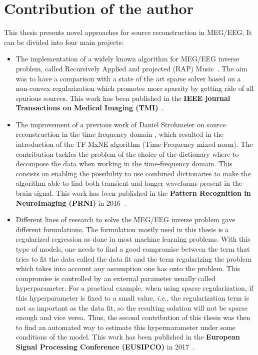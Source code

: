 \section*{Contribution of the author}
This thesis presents novel approaches for source reconstruction in MEG/EEG. It can be divided into four main projects:
\begin{itemize}
\item The implementation of a widely known algorithm for MEG/EEG inverse problem, called Recursively Applied and projected (RAP) Music~\cite{mosher-leahy:1999}. The aim was to have a comparison with a state of the art sparse solver based on a non-convex regularization which promotes more sparsity by getting ride of all spurious sources. This work has been published in the \textbf{IEEE journal Transactions on Medical Imaging (TMI)}~\cite{strohmeier-etal:16}.

\item The improvement of a previous work of Daniel Strohmeier on source reconstruction in the time frequency domain , which resulted in the introduction of the TF-MxNE algorithm (Time-Frequency mixed-norm). The contribution tackles the problem of the choice of the dictionary where to decompose the data when working in the time-frequency domain. This consists on enabling the possibility to use combined dictionaries to make the algorithm able to find both transient and longer waveforms present in the brain signal. This work has been published in the \textbf{Pattern Recognition in NeuroImaging (PRNI)} in 2016~\cite{bekhti2016m}.

\item Different lines of research to solve the MEG/EEG inverse problem gave different formulations. The formulation mostly used in this thesis is a regularized regression as done in most machine learning problems. With this type of models, one needs to find a good compromise between the term that tries to fit the data called the data fit and the term regularizing the problem which takes into account any assumption one has onto the problem. This compromise is controlled by an external parameter usually called hyperparameter. For a practical example, when using sparse regularization, if this hyperparameter is fixed to a small value, \textit{i.e.}, the regularization term is not as important as the data fit, so the resulting solution will not be sparse enough and vice versa. Thus, the second contribution of this thesis was then to find an automated way to estimate this hypermarameter under some conditions of the model. This work has been published in the \textbf{European Signal Processing Conference (EUSIPCO)} in 2017~\cite{bekhti_eusipco}.


\end{itemize}
